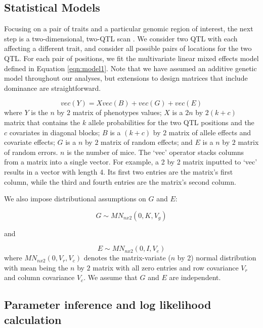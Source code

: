 \documentclass[oneside]{book}\usepackage[]{graphicx}\usepackage[]{color}
\begin{document}
\subsection{Statistical Models}

Focusing on a pair of traits and a particular genomic region of
interest, the next step is a two-dimensional, two-QTL
scan \citep{jiang1995multiple}. We consider two QTL with each
affecting a different trait, and consider all possible pairs of
locations for the two QTL. For each pair of positions, we fit
the multivariate linear mixed effects model defined in Equation
\ref{eqn:model1}. Note that we have
assumed an additive genetic model throughout our analyses, but
extensions to design matrices that include dominance are
straightforward.


\begin{equation}
vec(Y) = X vec(B) + vec(G) + vec(E)
\label{eqn:model1}
\end{equation}
where $Y$ is the $n$ by $2$ matrix of phenotypes values;
$X$ is a $2n$ by $2(k + c)$
matrix that contains the $k$ allele probabilities for the two QTL
positions and the $c$
covariates in diagonal blocks; $B$ is a $(k + c)$ by $2$ matrix of
allele effects and covariate effects; $G$ is a $n$ by $2$ matrix of
random effects; and $E$ is a $n$ by $2$ matrix of random errors. $n$
is the number of mice. The `vec' operator stacks columns from a matrix
into a single vector. For example, a 2 by 2 matrix inputted to `vec'
results in a vector with length 4. Its first two entries are the
matrix's first column, while the third and fourth entries are the
matrix's second column.


We also impose distributional assumptions on $G$ and $E$:

\begin{equation}
G \sim MN_{n x 2}(0, K, V_g)
\label{eqn:model2}
\end{equation}

and

\begin{equation}
E \sim MN_{nx2}(0, I, V_e)
\label{eqn:model3}
\end{equation}
where $MN_{n x 2}(0, V_r, V_c)$ denotes the matrix-variate ($n$ by 2)
normal distribution with mean being the $n$ by $2$ matrix with all
zero entries and row covariance $V_r$ and column covariance $V_c$. We
assume that $G$ and $E$ are independent.


\subsection{Parameter inference and log likelihood calculation}
\end{document}
